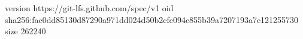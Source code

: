 version https://git-lfs.github.com/spec/v1
oid sha256:fac0dd85130d87290a971dd024d50b2cfe094c855b39a7207193a7c121255730
size 262240
